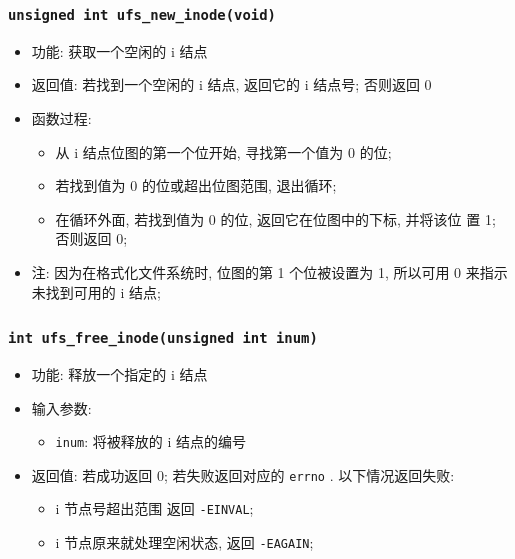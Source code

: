 \documentclass[nofonts]{ctexart}
\begin{document}
  \subsubsection[\texttt{ufs\_new\_inode}]{\texttt{unsigned int ufs\_new\_inode(void)}}
  \begin{itemize}
\item
  功能: 获取一个空闲的 i 结点
\item
  返回值: 若找到一个空闲的 i 结点, 返回它的 i 结点号; 否则返回 0
\item
  函数过程:

  \begin{itemize}
  \item
    从 i 结点位图的第一个位开始, 寻找第一个值为 0 的位;
  \item
    若找到值为 0 的位或超出位图范围, 退出循环;
  \item
    在循环外面, 若找到值为 0 的位, 返回它在位图中的下标, 并将该位 置 1;
    否则返回 0;
  \end{itemize}
\item
  注: 因为在格式化文件系统时, 位图的第 1 个位被设置为 1, 所以可用 0
  来指示未找到可用的 i 结点;
  \end{itemize}
  \subsubsection[\texttt{ufs\_free\_inode}]{\texttt{int ufs\_free\_inode(unsigned int inum)}}
  \begin{itemize}
\item
  功能: 释放一个指定的 i 结点
\item
  输入参数:

  \begin{itemize}
  \item
    \texttt{inum}: 将被释放的 i 结点的编号
  \end{itemize}
\item
  返回值: 若成功返回 0; 若失败返回对应的 \texttt{errno} .
  以下情况返回失败:

  \begin{itemize}
  \item
    i 节点号超出范围 返回 \texttt{-EINVAL};
  \item
    i 节点原来就处理空闲状态, 返回 \texttt{-EAGAIN};
  \end{itemize}
\end{itemize}
\end{document}
